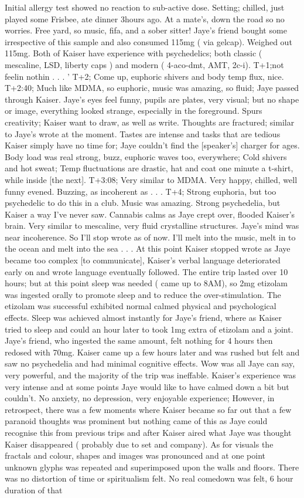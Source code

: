 \documentclass[12pt]{book}
\begin{document}
Initial allergy test showed no reaction to sub-active dose. Setting; chilled, just played some Frisbee, ate dinner 3hours ago. At a mate's, down the road so no worries. Free yard, so music, fifa, and a sober sitter! Jaye's friend bought some irrespective of this sample and also consumed 115mg ( via gelcap). Weighed out 115mg. Both of Kaiser have experience with psychedelics; both classic ( mescaline, LSD, liberty caps ) and modern ( 4-aco-dmt, AMT, 2c-i). T+1;not feelin nothin . . .  ' T+2; Come up, euphoric shivers and body temp flux, nice. T+2:40; Much like MDMA, so euphoric, music was amazing, so fluid; Jaye passed through Kaiser. Jaye's eyes feel funny, pupils are plates, very visual; but no shape or image, everything looked strange, especially in the foreground. Spurs creativity; Kaiser want to draw, as well as write. Thoughts are fractured; similar to Jaye's wrote at the moment. Tastes are intense and tasks that are tedious Kaiser simply have no time for; Jaye couldn't find the [speaker's] charger for ages. Body load was real strong, buzz, euphoric waves too, everywhere; Cold shivers and hot sweat; Temp fluctuations are drastic, hat and coat one minute a t-shirt, while inside [the next]. T+3:08; Very similar to MDMA. Very happy, chilled, well funny evened. Buzzing, as incoherent as . . .  T+4; Strong euphoria, but too psychedelic to do this in a club. Music was amazing. Strong psychedelia, but Kaiser a way I've never saw. Cannabis calms as Jaye crept over, flooded Kaiser's brain. Very similar to mescaline, very fluid crystalline structures. Jaye's mind was near incoherence. So I'll stop wrote as of now. I'll melt into the music, melt in to the ocean and melt into the sea . . .  At this point Kaiser stopped wrote as Jaye became too complex [to communicate], Kaiser's verbal language deteriorated early on and wrote language eventually followed. The entire trip lasted over 10 hours; but at this point sleep was needed ( came up to 8AM), so 2mg etizolam was ingested orally to promote sleep and to reduce the over-stimulation. The etizolam was successful exhibited normal calmed physical and psychological effects. Sleep was achieved almost instantly for Jaye's friend, where as Kaiser tried to sleep and could an hour later to took 1mg extra of etizolam and a joint. Jaye's friend, who ingested the same amount, felt nothing for 4 hours then redosed with 70mg. Kaiser came up a few hours later and was rushed but felt and saw no psychedelia and had minimal cognitive effects. Wow was all Jaye can say, very powerful, and the majority of the trip was ineffable. Kaiser's experience was very intense and at some points Jaye would like to have calmed down a bit but couldn't. No anxiety, no depression, very enjoyable experience; However, in retrospect, there was a few moments where Kaiser became so far out that a few paranoid thoughts was prominent but nothing came of this as Jaye could recognise this from previous trips and after Kaiser aired what Jaye was thought Kaiser disappeared ( probably due to set and company). As for visuals the fractals and colour, shapes and images was pronounced and at one point unknown glyphs was repeated and superimposed upon the walls and floors. There was no distortion of time or spiritualism felt. No real comedown was felt, 6 hour duration of that 
\end{document}
